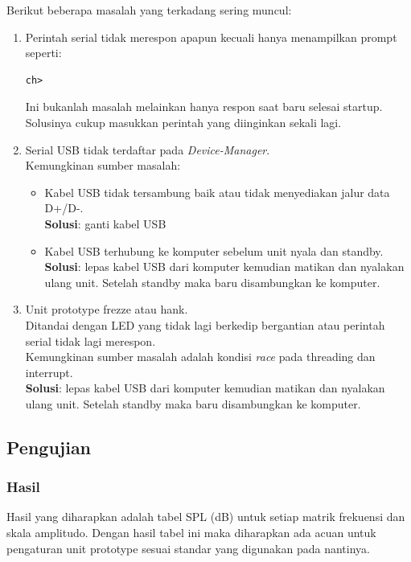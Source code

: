 \documentclass[12pt,]{article}
\begin{document}
	Berikut beberapa masalah yang terkadang sering muncul:
	\begin{enumerate}
		\item Perintah serial tidak merespon apapun kecuali hanya menampilkan prompt seperti:
		\begin{verbatim}
ch>
		\end{verbatim}
		Ini bukanlah masalah melainkan hanya respon saat baru selesai startup.
		Solusinya cukup masukkan perintah yang diinginkan sekali lagi.
		
		\item Serial USB tidak terdaftar pada \textit{Device-Manager}.\\
		Kemungkinan sumber masalah:
		\begin{itemize}
			\item Kabel USB tidak tersambung baik atau tidak menyediakan jalur data D+/D-.\\
			\textbf{Solusi}: ganti kabel USB
			
			\item Kabel USB terhubung ke komputer sebelum unit nyala dan standby.\\
			\textbf{Solusi}: lepas kabel USB dari komputer kemudian matikan dan nyalakan ulang unit.
			Setelah standby maka baru disambungkan ke komputer.
		\end{itemize}
		
		\item Unit prototype frezze atau hank.\\
		Ditandai dengan LED yang tidak lagi berkedip bergantian atau perintah serial tidak lagi merespon.\\
		Kemungkinan sumber masalah adalah kondisi \textit{race} pada threading dan interrupt.\\
		\textbf{Solusi}: lepas kabel USB dari komputer kemudian matikan dan nyalakan ulang unit.
		Setelah standby maka baru disambungkan ke komputer.
	\end{enumerate}
	
	\newpage
	\subsection{Pengujian}
	
	\subsubsection{Hasil}
	
	Hasil yang diharapkan adalah tabel SPL (dB) untuk setiap matrik frekuensi dan skala amplitudo.
	Dengan hasil tabel ini maka diharapkan ada acuan untuk pengaturan unit prototype sesuai standar yang digunakan pada nantinya.
	
\end{document}
